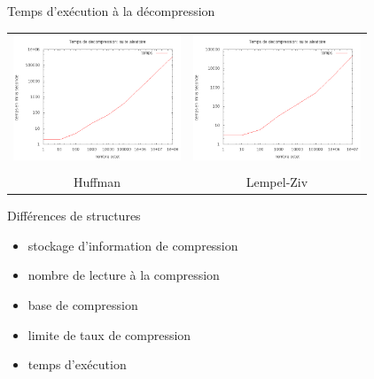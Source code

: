 \documentclass[french]{beamer}
\begin{document}
\begin{frame}{Temps d'exécution à la décompression}
	\begin{center}
	
\begin{tabular}{c| c}
	\includegraphics[width=5cm]{tempsDhA.png} & 
	\includegraphics[width=5cm]{tempsDlzA.png}\\  &  \\ 
	Huffman & Lempel-Ziv
	\end{tabular}	
	\end{center}
\end{frame}

\begin{frame}{Différences de structures}
	\begin{center}
	 \begin{itemize}
		\item stockage d'information de compression
		\item nombre de lecture à la compression
		\item base de compression 
		\item limite de taux de compression	
		\item temps d’exécution  
	 
	 \end{itemize}
	\end{center}
\end{frame}
\end{document}
